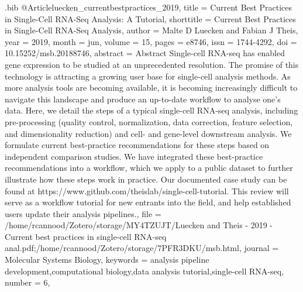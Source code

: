 \documentclass[
  table,
  10pt,
  a4paper]{article}
\begin{document}
\begin{filecontents}{\jobname.bib}
@Article{luecken_currentbestpractices_2019,
	title = {Current Best Practices in Single-Cell {{RNA}}-Seq Analysis: A Tutorial},
	shorttitle = {Current Best Practices in Single-Cell {{RNA}}-Seq Analysis},
	author = {Malte D Luecken and Fabian J Theis},
	year = {2019},
	month = {jun},
	volume = {15},
	pages = {e8746},
	issn = {1744-4292},
	doi = {10.15252/msb.20188746},
	abstract = {Abstract Single-cell RNA-seq has enabled gene expression to be studied at an unprecedented resolution. The promise of this technology is attracting a growing user base for single-cell analysis methods. As more analysis tools are becoming available, it is becoming increasingly difficult to navigate this landscape and produce an up-to-date workflow to analyse one's data. Here, we detail the steps of a typical single-cell RNA-seq analysis, including pre-processing (quality control, normalization, data correction, feature selection, and dimensionality reduction) and cell- and gene-level downstream analysis. We formulate current best-practice recommendations for these steps based on independent comparison studies. We have integrated these best-practice recommendations into a workflow, which we apply to a public dataset to further illustrate how these steps work in practice. Our documented case study can be found at https://www.github.com/theislab/single-cell-tutorial. This review will serve as a workflow tutorial for new entrants into the field, and help established users update their analysis pipelines.},
	file = {/home/rcannood/Zotero/storage/MY4TZUJT/Luecken and Theis - 2019 - Current best practices in single-cell RNA-seq anal.pdf;/home/rcannood/Zotero/storage/7PFR3DKU/msb.html},
	journal = {Molecular Systems Biology},
	keywords = {analysis pipeline development,computational biology,data analysis tutorial,single-cell RNA-seq},
	number = {6},
}


\end{filecontents}
\end{document}
